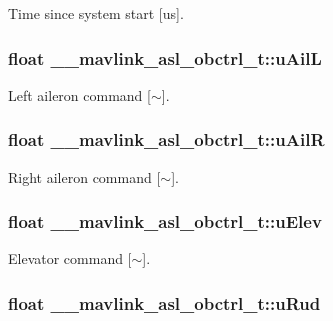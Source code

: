 Time since system start \mbox{[}us\mbox{]}. 

\hypertarget{struct____mavlink__asl__obctrl__t_ad5520d4e6c2024ee5257383cee1fe4e6}{
\subsubsection[{u\+Ail\+L}]{\setlength{\rightskip}{0pt plus 5cm}float \+\_\+\+\_\+mavlink\+\_\+asl\+\_\+obctrl\+\_\+t\+::u\+Ail\+L}}\label{struct____mavlink__asl__obctrl__t_ad5520d4e6c2024ee5257383cee1fe4e6}


Left aileron command \mbox{[}$\sim$\mbox{]}. 

\hypertarget{struct____mavlink__asl__obctrl__t_a610cf9220c5fcb44a1497d91cb8b3320}{
\subsubsection[{u\+Ail\+R}]{\setlength{\rightskip}{0pt plus 5cm}float \+\_\+\+\_\+mavlink\+\_\+asl\+\_\+obctrl\+\_\+t\+::u\+Ail\+R}}\label{struct____mavlink__asl__obctrl__t_a610cf9220c5fcb44a1497d91cb8b3320}


Right aileron command \mbox{[}$\sim$\mbox{]}. 

\hypertarget{struct____mavlink__asl__obctrl__t_aec6c1bff8f21f99a19a0850b78a04b4b}{
\subsubsection[{u\+Elev}]{\setlength{\rightskip}{0pt plus 5cm}float \+\_\+\+\_\+mavlink\+\_\+asl\+\_\+obctrl\+\_\+t\+::u\+Elev}}\label{struct____mavlink__asl__obctrl__t_aec6c1bff8f21f99a19a0850b78a04b4b}


Elevator command \mbox{[}$\sim$\mbox{]}. 

\hypertarget{struct____mavlink__asl__obctrl__t_a0a900f213e6969fd40756334a123daf7}{
\subsubsection[{u\+Rud}]{\setlength{\rightskip}{0pt plus 5cm}float \+\_\+\+\_\+mavlink\+\_\+asl\+\_\+obctrl\+\_\+t\+::u\+Rud}}\label{struct____mavlink__asl__obctrl__t_a0a900f213e6969fd40756334a123daf7}



